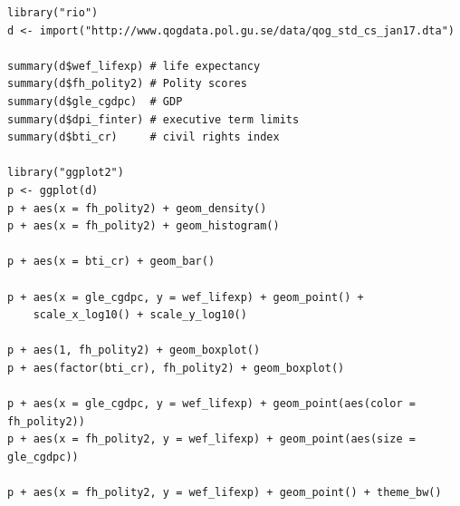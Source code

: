 \documentclass[17pt]{beamer} %
\begin{document}



\begin{frame}[fragile]

\tiny

\begin{verbatim}
library("rio")
d <- import("http://www.qogdata.pol.gu.se/data/qog_std_cs_jan17.dta")

summary(d$wef_lifexp) # life expectancy
summary(d$fh_polity2) # Polity scores
summary(d$gle_cgdpc)  # GDP
summary(d$dpi_finter) # executive term limits
summary(d$bti_cr)     # civil rights index

library("ggplot2")
p <- ggplot(d)
p + aes(x = fh_polity2) + geom_density()
p + aes(x = fh_polity2) + geom_histogram()

p + aes(x = bti_cr) + geom_bar()

p + aes(x = gle_cgdpc, y = wef_lifexp) + geom_point() + 
    scale_x_log10() + scale_y_log10()

p + aes(1, fh_polity2) + geom_boxplot()
p + aes(factor(bti_cr), fh_polity2) + geom_boxplot()

p + aes(x = gle_cgdpc, y = wef_lifexp) + geom_point(aes(color = fh_polity2))
p + aes(x = fh_polity2, y = wef_lifexp) + geom_point(aes(size = gle_cgdpc))

p + aes(x = fh_polity2, y = wef_lifexp) + geom_point() + theme_bw()
\end{verbatim}

\end{frame}






\appendix
\frame{}
\end{document}

